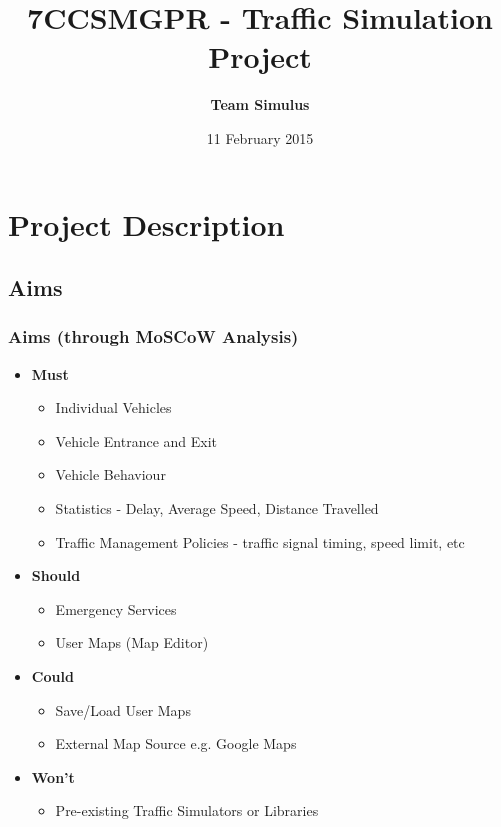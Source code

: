 \documentclass{beamer}
\title[Welcome]{7CCSMGPR - Traffic Simulation Project} %
\author{\textbf{Team Simulus}} %
\institute[KCL] %
{
King's College London \\ %
\medskip
\textit{https://github.com/leorohr/simulus} %
}
\date{11 February 2015} %
\begin{document}
\begin{frame}
\titlepage %
\end{frame}



\section{Project Description} %

\subsection{Aims} %

\begin{frame}
\frametitle{Aims (through MoSCoW Analysis)}

\begin{itemize}
\item \textbf{Must}
	\begin{itemize}
		\item Individual Vehicles
		\item Vehicle Entrance and Exit 
		\item Vehicle Behaviour
		\item Statistics - Delay, Average Speed, Distance Travelled
		\item Traffic Management Policies - traffic signal timing, speed limit, etc
	\end{itemize}
\item \textbf{Should}
	\begin{itemize}
		\item Emergency Services
		\item User Maps (Map Editor)
	\end{itemize}
\item \textbf{Could}
	\begin{itemize}
		\item Save/Load User Maps
		\item External Map Source e.g. Google Maps
		\end{itemize}
\item \textbf{Won't}
	\begin{itemize}
		\item Pre-existing Traffic Simulators or Libraries
	\end{itemize}	
\end{itemize}

\end{frame}
\end{document}
